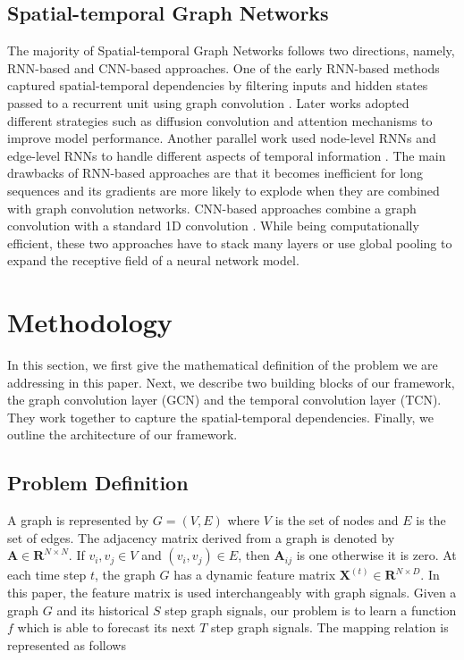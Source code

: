 \subsection{Spatial-temporal Graph  Networks}
The majority of Spatial-temporal Graph  Networks follows two directions, namely, RNN-based and CNN-based approaches. One of the early RNN-based methods captured spatial-temporal dependencies by filtering inputs and hidden states passed to a recurrent unit using graph convolution \cite{seo2018structured}. Later works adopted different strategies such as diffusion convolution \cite{li2018diffusion} and attention mechanisms \cite{zhang2018gaan} to improve model performance. Another parallel work used node-level RNNs and edge-level RNNs to handle different aspects of temporal information \cite{jain2016structural}. The main drawbacks of RNN-based approaches are that it becomes inefficient for long sequences and its gradients are more likely to explode when they are combined with graph convolution networks. CNN-based approaches combine a graph convolution with a standard 1D convolution \cite{yu2018spatio,yan2018spatial}. 
While being computationally efficient, these two approaches have to stack many layers or use global pooling to expand the receptive field of a neural network model.



\section{Methodology}
In this section, we first give the mathematical definition of the problem we are addressing in this paper. Next, we describe two building blocks of our framework, the graph convolution layer (GCN) and the temporal convolution layer (TCN). They work together to capture the spatial-temporal dependencies. Finally, we outline the architecture of our framework.

\subsection{Problem Definition}
A graph is represented by $G=(V,E)$ where $V$ is the set of nodes and $E$ is the set of edges. The adjacency matrix derived from a graph is denoted by $\mathbf{A} \in \mathbf{R}^{N\times N}$. If $v_i,v_j \in V$ and $(v_i,v_j) \in E$, then $\mathbf{A}_{ij}$ is one otherwise it is zero. At each time step $t$, the graph $G$ has a dynamic feature matrix $\mathbf{X}^{(t)} \in \mathbf{R}^{N\times D}$. In this paper, the feature matrix is used interchangeably with graph signals.  Given a graph $G$ and its historical $S$ step graph signals, our problem is to learn a function $f$ which is able to forecast its next $T$ step graph signals.  The mapping relation is represented as follows

